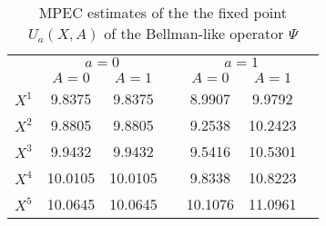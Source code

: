 \documentclass[11pt,reqno]{amsart}
\theoremstyle{definition}
\begin{document}
\begin{table}[!htb]
\centering
{}
	\caption{MPEC estimates of the the fixed point $U_{a}(X, A)$ of the Bellman-like operator $\Psi$}
\begin{tabular}{ccccccc}
 \hline 
 & \multicolumn{2}{c}{$a = 0$} & \multicolumn{4}{c}{$a = 1$}\\
 \cmidrule(r){2-3} \cmidrule(r){5-7}
 & $A = 0$ & $A = 1$  & & $A = 0$ & $A = 1$ &   \\
 \toprule
\midrule
 $X^{1}$ \quad & 9.8375  & 9.8375 & & 8.9907 & 9.9792 \\
 $X^{2}$ \quad & 9.8805  & 9.8805 & & 9.2538 & 10.2423 \\
 $X^{3}$ \quad & 9.9432  & 9.9432 & & 9.5416 & 10.5301 \\
 $X^{4}$ \quad & 10.0105  & 10.0105 & & 9.8338 & 10.8223 \\
 $X^{5}$ \quad & 10.0645 & 10.0645 &  & 10.1076  & 11.0961  \\ \toprule \hline
\end{tabular}
\label{table:table2}
\end{table}
\end{document}
